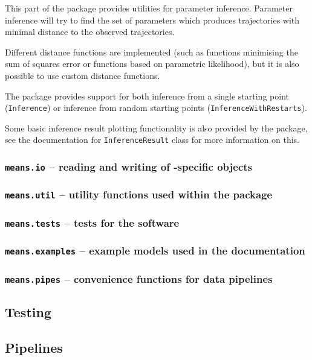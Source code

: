 This part of the package provides utilities for parameter inference.
Parameter inference will try to find the set of parameters which
produces trajectories with minimal distance to the observed trajectories.

Different distance functions are implemented (such as functions minimising the sum of squares error
or functions based on parametric likelihood), but it is also possible to use custom distance functions.

The package provides support for both inference from a single starting point (\verb"Inference")
or inference from random starting points (\verb"InferenceWithRestarts").

Some basic inference result plotting functionality is also provided by the package, see the documentation for
\verb"InferenceResult" class for more information on this. 

\subsubsection{{\tt means.io} -- reading and writing of \means-specific objects}
\subsubsection{{\tt means.util} -- utility functions used within the package}
\subsubsection{{\tt means.tests} -- tests for the software}
\subsubsection{{\tt means.examples} -- example models used in the documentation}
\subsubsection{{\tt means.pipes} -- convenience functions for data pipelines}

\subsection{Testing}
\subsection{Pipelines}

